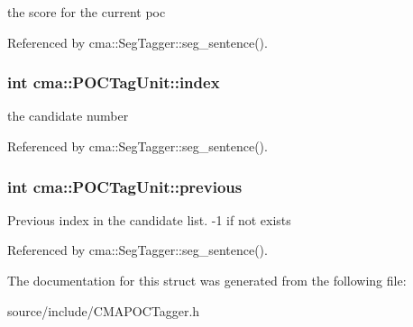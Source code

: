 the score for the current poc 

Referenced by cma::SegTagger::seg\_\-sentence().
\subsubsection{\setlength{\rightskip}{0pt plus 5cm}int {\bf cma::POCTagUnit::index}}\label{structcma_1_1POCTagUnit_408429985543c203e36a6e8c6921935c}


the candidate number 

Referenced by cma::SegTagger::seg\_\-sentence().
\subsubsection{\setlength{\rightskip}{0pt plus 5cm}int {\bf cma::POCTagUnit::previous}}\label{structcma_1_1POCTagUnit_65a1e27d97dfa822fee58fbe3dc2a2a3}


Previous index in the candidate list. -1 if not exists 

Referenced by cma::SegTagger::seg\_\-sentence().

The documentation for this struct was generated from the following file:\begin{CompactItemize}
\item 
source/include/CMAPOCTagger.h\end{CompactItemize}
